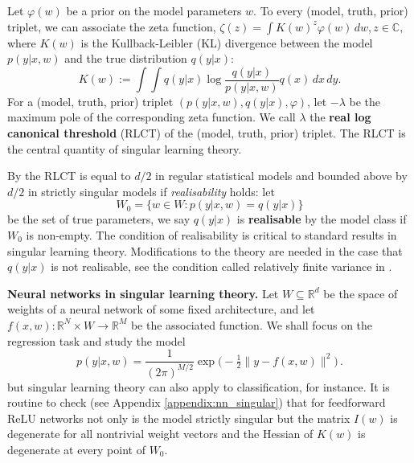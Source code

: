 \documentclass{article} %
\def\lto{\longrightarrow}
\begin{document}
Let  $\varphi(w)$ be a prior on the model parameters $w$.
To every (model, truth, prior) triplet, we can associate the zeta function,
$
\zeta(z) = \int K(w)^z \varphi(w) \,dw, z \in \mathbb C,
$
where $K(w)$ is the Kullback-Leibler (KL) divergence between the model $p(y|x,w)$ and the true distribution $q(y|x)$:
\begin{equation}
    K(w) := \int \!\int q(y|x) \log \frac{ q(y|x) }{ p(y|x,w) } q(x) \,dx \,dy.
\label{eq:KL}
\end{equation}
For a (model, truth, prior) triplet $(p(y|x,w),q(y|x),\varphi)$, let $-\lambda$ be the maximum pole of the corresponding zeta function. We call $\lambda$ the \textbf{real log canonical threshold} (RLCT) \citep{watanabe_algebraic_2009} of the (model, truth, prior) triplet. The RLCT is the central quantity of singular learning theory. 

By {\citet[Theorem 6.4]{watanabe_algebraic_2009}} the RLCT is equal to $d/2$ in regular statistical models and bounded above by $d/2$ in strictly singular models if \textit{realisability} holds: let 
$$
W_0 = \{w \in W: p(y|x,w)=q(y|x)\}
$$
be the set of true parameters,
we say $q(y|x)$ is \textbf{realisable} by the model class if $W_0$ is non-empty.
The condition of realisability is critical to standard results in singular learning theory. Modifications to the theory are needed in the case that $q(y|x)$ is not realisable, see the condition called relatively finite variance in \citet{watanabe_mathematical_2018}.

\textbf{Neural networks in singular learning theory.} Let $W \subseteq \mathbb{R}^d$ be the space of weights of a neural network of some fixed architecture, and let $f(x,w): \mathbb{R}^N \times W \lto \mathbb{R}^M$ be the associated function. We shall focus on the regression task and study the model
\begin{equation}
p(y|x,w) = \frac{1}{(2 \pi)^{M/2}} \exp\Big(-\tfrac{1}{2} \| y - f(x,w) \|^2 \Big)\,.
\label{eq:gaussian_model_in_w}
\end{equation}
but singular learning theory can also apply to classification, for instance. 
It is routine to check (see Appendix \ref{appendix:nn_singular}) that for feedforward ReLU networks not only is the model strictly singular but the matrix $I(w)$ is degenerate for all nontrivial weight vectors and the Hessian of $K(w)$ is degenerate at every point of $W_0$.
\end{document}
